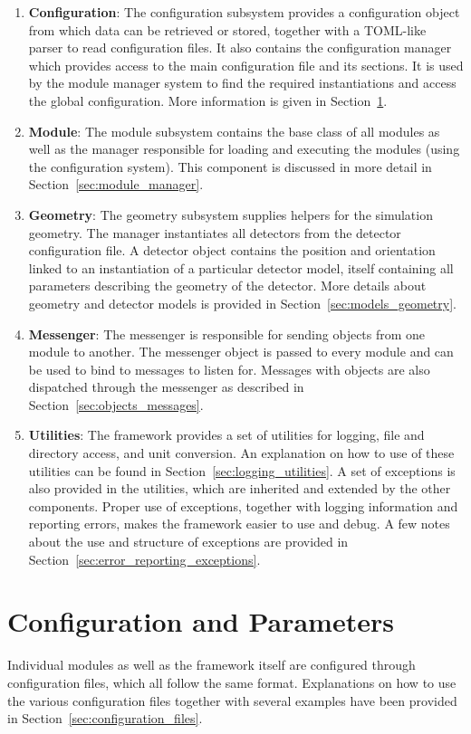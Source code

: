 \begin{enumerate}
\item \textbf{Configuration}: The configuration subsystem provides a configuration object from which data can be retrieved or stored, together with a TOML-like~\cite{tomlgit} parser to read configuration files.
It also contains the \apsq configuration manager which provides access to the main configuration file and its sections.
It is used by the module manager system to find the required instantiations and access the global configuration.
More information is given in Section~\ref{sec:config_parameters}.
\item \textbf{Module}: The module subsystem contains the base class of all \apsq modules as well as the manager responsible for loading and executing the modules (using the configuration system).
This component is discussed in more detail in Section~\ref{sec:module_manager}.
\item \textbf{Geometry}: The geometry subsystem supplies helpers for the simulation geometry.
The manager instantiates all detectors from the detector configuration file.
A detector object contains the position and orientation linked to an instantiation of a particular detector model, itself containing all parameters describing the geometry of the detector.
More details about geometry and detector models is provided in Section~\ref{sec:models_geometry}.
\item \textbf{Messenger}: The messenger is responsible for sending objects from one module to another.
The messenger object is passed to every module and can be used to bind to messages to listen for.
Messages with objects are also dispatched through the messenger as described in Section~\ref{sec:objects_messages}.
\item \textbf{Utilities}: The framework provides a set of utilities for logging, file and directory access, and unit conversion.
An explanation on how to use of these utilities can be found in Section~\ref{sec:logging_utilities}.
A set of \CPP exceptions is also provided in the utilities, which are inherited and extended by the other components.
Proper use of exceptions, together with logging information and reporting errors, makes the framework easier to use and debug.
A few notes about the use and structure of exceptions are provided in Section~\ref{sec:error_reporting_exceptions}.
\end{enumerate}

\section{Configuration and Parameters}
\label{sec:config_parameters}
Individual modules as well as the framework itself are configured through configuration files, which all follow the same format.
Explanations on how to use the various configuration files together with several examples have been provided in Section~\ref{sec:configuration_files}.

